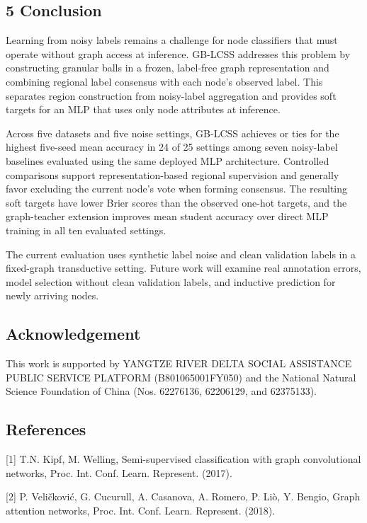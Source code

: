 \subsection{5 Conclusion}\label{conclusion}

Learning from noisy labels remains a challenge for node classifiers that must operate without graph access at inference. GB-LCSS addresses this problem by constructing granular balls in a frozen, label-free graph representation and combining regional label consensus with each node's observed label. This separates region construction from noisy-label aggregation and provides soft targets for an MLP that uses only node attributes at inference.

Across five datasets and five noise settings, GB-LCSS achieves or ties for the highest five-seed mean accuracy in 24 of 25 settings among seven noisy-label baselines evaluated using the same deployed MLP architecture. Controlled comparisons support representation-based regional supervision and generally favor excluding the current node's vote when forming consensus. The resulting soft targets have lower Brier scores than the observed one-hot targets, and the graph-teacher extension improves mean student accuracy over direct MLP training in all ten evaluated settings.

The current evaluation uses synthetic label noise and clean validation labels in a fixed-graph transductive setting. Future work will examine real annotation errors, model selection without clean validation labels, and inductive prediction for newly arriving nodes.

\subsection{Acknowledgement}\label{acknowledgement}

This work is supported by YANGTZE RIVER DELTA SOCIAL ASSISTANCE PUBLIC SERVICE PLATFORM (B801065001FY050) and the National Natural Science Foundation of China (Nos. 62276136, 62206129, and 62375133).

\subsection{References}\label{references}

{[}1{]} T.N. Kipf, M. Welling, Semi-supervised classification with graph convolutional networks, Proc. Int. Conf. Learn. Represent. (2017).

{[}2{]} P. Veličković, G. Cucurull, A. Casanova, A. Romero, P. Liò, Y. Bengio, Graph attention networks, Proc. Int. Conf. Learn. Represent. (2018).

